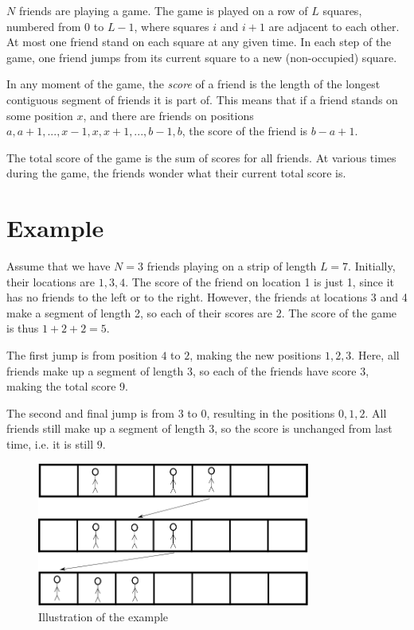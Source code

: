 \newcommand\version{v2}
$N$ friends are playing a game. The game is played on a row of $L$ squares, numbered from $0$ to $L - 1$, where squares $i$ and $i+1$ are adjacent to each other. At most one friend stand on each square
at any given time. In each step of the game, one friend jumps from its current square to a new (non-occupied) square.

In any moment of the game, the \emph{score} of a friend is the length of the longest contiguous segment
of friends it is part of. This means that if a friend stands on some position $x$, and there are friends
on positions $a, a + 1, ..., x - 1, x, x + 1, ..., b - 1, b$, the score of the friend is $b - a + 1$.

The total score of the game is the sum of scores for all friends. At various times during the game, the friends wonder what their current total score is.

\section*{Example}
Assume that we have $N = 3$ friends playing on a strip of length $L = 7$. Initially,
their locations are $1, 3, 4$. The score of the friend on location 1 is just 1, since it has no friends
to the left or to the right. However, the friends at locations 3 and 4 make a segment of length 2, so
each of their scores are 2. The score of the game is thus $1 + 2 + 2 = 5$.

The first jump is from position $4$ to $2$, making the new positions $1, 2, 3$. Here, all friends
make up a segment of length 3, so each of the friends have score 3, making the total score 9.

The second and final jump is from $3$ to $0$, resulting in the positions $0, 1, 2$. All friends
still make up a segment of length 3, so the score is unchanged from last time, i.e. it is still 9.

\begin{figure}[h!]
  \centering
  \includegraphics[width=0.8\textwidth]{sample.png}
  \caption{Illustration of the example}
\end{figure}

